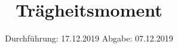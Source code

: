 

\subject{V101}
\title{Trägheitsmoment}
\date{%
  Durchführung: 17.12.2019  \hspace{3em}
  Abgabe: 07.12.2019
}



\maketitle
\thispagestyle{empty}
\tableofcontents
\newpage








\printbibliography{}


